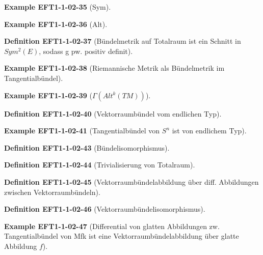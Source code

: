 \documentclass[10pt, letterpaper]{article}
\newcommand{\CustomHeading}[3]{%
  \par\medskip\noindent%
  \textbf{#1 #2} \textnormal{(#3)}.\enskip%
}
\newenvironment{DEF}[2]{\CustomHeading{Definition}{#1}{#2}}{}
\newenvironment{EXA}[2]{\CustomHeading{Example}{#1}{#2}}{}
\begin{document}
\begin{EXA}{EFT1-1-02-35}{Sym}
\end{EXA}

\begin{EXA}{EFT1-1-02-36}{Alt}
\end{EXA}

\begin{DEF}{EFT1-1-02-37}{Bündelmetrik auf Totalraum ist ein Schnitt in $Sym^2(E)$, sodass g pw. positiv definit}
\end{DEF}

\begin{EXA}{EFT1-1-02-38}{Riemannische Metrik als Bündelmetrik im Tangentialbündel}
\end{EXA}

\begin{EXA}{EFT1-1-02-39}{$\Gamma (Alt^k(TM))$}
\end{EXA}

\begin{DEF}{EFT1-1-02-40}{Vektorraumbündel vom endlichen Typ}
\end{DEF}

\begin{EXA}{EFT1-1-02-41}{Tangentialbündel von $S^n$ ist von endlichem Typ}
\end{EXA}

\begin{DEF}{EFT1-1-02-43}{Bündelisomorphismus}
\end{DEF}

\begin{DEF}{EFT1-1-02-44}{Trivialisierung von Totalraum}
\end{DEF}

\begin{DEF}{EFT1-1-02-45}{Vektorraumbündelabbildung über diff. Abbildungen zwischen Vektorraumbündeln}
\end{DEF}

\begin{DEF}{EFT1-1-02-46}{Vektorraumbündelisomorphismus}
\end{DEF}

\begin{EXA}{EFT1-1-02-47}{Differential von glatten Abbildungen zw. Tangentialbündel von Mfk ist eine Vektorraumbündelabbildung über glatte Abbildung $f$}
\end{EXA}
\end{document}
